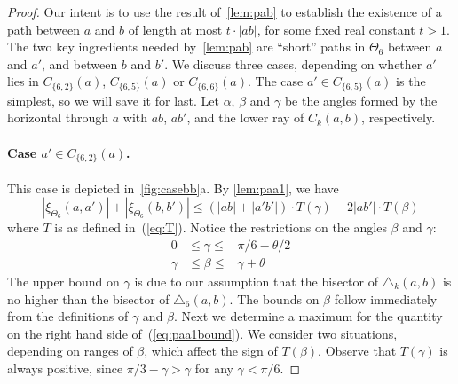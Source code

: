 \documentclass[runningheads,a4paper]{llncs}
\newcommand{\pp}{\xi}
\begin{document}
\begin{proof}
Our intent is to use the result of~\autoref{lem:pab} to establish the existence of a path between $a$ and $b$ of length at most $t\cdot|ab|$, for some fixed real constant $t > 1$. The two key ingredients needed by~\autoref{lem:pab} are ``short'' paths in $\Theta_6$ between $a$ and $a'$, and between $b$ and $b'$. 
We discuss three cases,  depending on whether $a'$ lies in $C_{\{6,2\}}(a)$, $C_{\{6,5\}}(a)$ or $C_{\{6,6\}}(a)$. The case 
$a' \in C_{\{6,5\}}(a)$ is the simplest, so we will save it for last. 
Let $\alpha$, $\beta$ and $\gamma$ be the angles formed by the horizontal through $a$ with $ab$, $ab'$, and the lower ray of $C_k(a, b)$, respectively. 

\paragraph{Case $a' \in C_{\{6,2\}}(a)$.} This case is depicted in~\autoref{fig:casebb}a. By \autoref{lem:paa1}, we have 
\begin{equation}
\label{eq:paa1bound}
 |\pp_{\Theta_6}(a, a')| + |\pp_{\Theta_6}(b, b')| \le (|ab|+|a'b'|)\cdot T(\gamma) - 2|ab'|\cdot T(\beta) 
\end{equation}
where $T$ is as defined in~(\ref{eq:T}). 
Notice the restrictions on the angles $\beta$ and $\gamma$:
\begin{eqnarray}
\nonumber 0  & \le \gamma \le  & \pi/6-\theta/2 \\
\gamma & \le \beta \le &\gamma+\theta 
\label{eq:gamma}
\end{eqnarray}
The upper bound on $\gamma$ is due to our assumption that the bisector of $\triangle_k(a,b)$ is no higher than the bisector of $\triangle_6(a,b)$. The bounds on $\beta$ follow immediately from the definitions of $\gamma$ and $\beta$. 
Next we determine a maximum for the quantity on the right hand side of~(\ref{eq:paa1bound}).  
We consider two situations, depending on ranges of $\beta$, which affect the sign of $T(\beta)$. Observe that $T(\gamma)$ is always positive, since $\pi/3-\gamma > \gamma$ for any $\gamma < \pi/6$. 


\end{proof}
\end{document}
